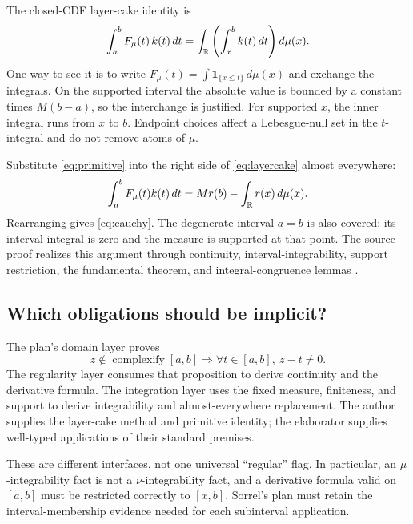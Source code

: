 \documentclass[11pt,a4paper]{article}
\numberwithin{equation}{section}
\theoremstyle{definition}\newtheorem{definition}[theorem]{Definition}
\theoremstyle{remark}\newtheorem{remark}[theorem]{Remark}
\begin{document}
The closed-CDF layer-cake identity is
\begin{equation}\label{eq:layercake}
 \int_a^b F_\mu(t)\,k(t)\,dt
 =\int_\mathbb R\left(\int_x^b k(t)\,dt\right)d\mu(x).
\end{equation}
One way to see it is to write
\(F_\mu(t)=\int\mathbf1_{\{x\le t\}}\,d\mu(x)\) and exchange the integrals.
On the supported interval the absolute value is bounded by a constant times
\(M(b-a)\), so the interchange is justified. For supported \(x\), the inner
integral runs from \(x\) to \(b\). Endpoint choices affect a Lebesgue-null set
in the \(t\)-integral and do not remove atoms of \(\mu\).

Substitute \eqref{eq:primitive} into the right side of \eqref{eq:layercake} almost everywhere:
\[
 \int_a^b F_\mu(t)k(t)\,dt
 =M r(b)-\int_\mathbb R r(x)\,d\mu(x).
\]
Rearranging gives \eqref{eq:cauchy}. The degenerate interval \(a=b\) is also
covered: its interval integral is zero and the measure is supported at that
point. The source proof realizes this argument through continuity,
interval-integrability, support restriction, the fundamental theorem, and
integral-congruence lemmas \cite{cauchy}.

\subsection{Which obligations should be implicit?}
The plan's domain layer proves
\[
 z\notin\operatorname{complexify}[a,b]\Longrightarrow
 \forall t\in[a,b],\ z-t\ne0.
\]
The regularity layer consumes that proposition to derive continuity and the
derivative formula. The integration layer uses the fixed measure, finiteness,
and support to derive integrability and almost-everywhere replacement.
The author supplies the layer-cake method and primitive identity; the
elaborator supplies well-typed applications of their standard premises.

These are different interfaces, not one universal ``regular'' flag. In
particular, an \(\mu\)-integrability fact is not a \(\nu\)-integrability fact,
and a derivative formula valid on \([a,b]\) must be restricted correctly to
\([x,b]\). Sorrel's plan must retain the interval-membership evidence needed
for each subinterval application.
\end{document}
